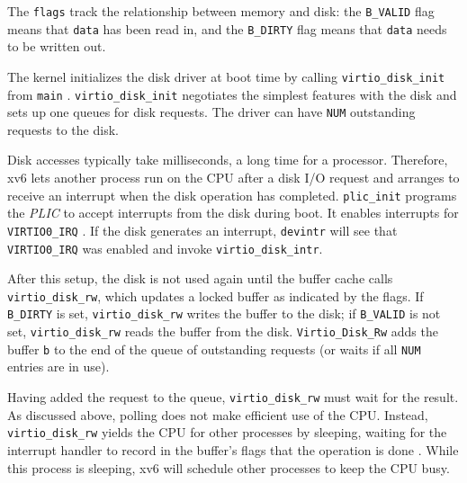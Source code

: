 The
\lstinline{flags}
track the relationship between memory and disk:
the
\lstinline{B_VALID}
flag means that
\lstinline{data}
has been read in, and
the 
\lstinline{B_DIRTY} 
flag means that
\lstinline{data}
needs to be written out.


The kernel initializes the disk driver at boot time by calling
\lstinline{virtio_disk_init}
from
\lstinline{main}
.
\lstinline{virtio_disk_init} negotiates the simplest features with the
disk and sets up one queues for disk requests.  The driver can have
\lstinline{NUM} outstanding requests to the disk.

Disk accesses typically take milliseconds, a long time for a
processor.  Therefore, xv6 lets another process run on the CPU after a
disk I/O request and arranges to receive an interrupt when the disk
operation has completed.
\lstinline{plic_init} programs
the \textit{PLIC} to accept interrupts from the disk during boot.  It
enables interrupts for \lstinline{VIRTIO0_IRQ}
.  If the disk generates an
interrupt, \lstinline{devintr}  will
see that \lstinline{VIRTIO0_IRQ} was enabled and invoke
\lstinline{virtio_disk_intr}.

After this setup, the disk is not used again until the buffer cache calls
\lstinline{virtio_disk_rw},
which updates a locked buffer
as indicated by the flags.
If
\lstinline{B_DIRTY}
is set,
\lstinline{virtio_disk_rw}
writes the buffer
to the disk; if
\lstinline{B_VALID}
is not set,
\lstinline{virtio_disk_rw}
reads the buffer from the disk.
\lstinline{Virtio_Disk_Rw}
adds the buffer
\lstinline{b}
to the end of the queue of outstanding requests (or waits if all
\lstinline{NUM} entries are in use).

Having added the request to the queue,
\lstinline{virtio_disk_rw}
must wait for the result.  As discussed above,
polling does not make efficient use of the CPU.
Instead,
\lstinline{virtio_disk_rw}
yields the CPU for other processes by sleeping,
waiting for the interrupt handler to 
record in the buffer's flags that the operation is done
.
While this process is sleeping,
xv6 will schedule other processes to keep the CPU busy.

